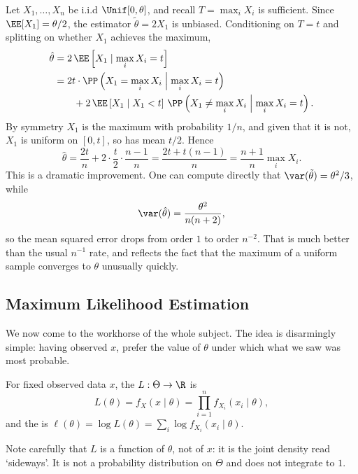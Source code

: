 \begin{example}
  Let $X_1, \dots, X_n$ be i.i.d $\Unif[0,\theta]$, and recall $T = \max_i X_i$ is sufficient. Since $\EE[X_1] = \theta/2$, the estimator $\tilde\theta = 2X_1$ is unbiased. Conditioning on $T = t$ and splitting on whether $X_1$ achieves the maximum,
  \begin{align*}
    \hat\theta &= 2\,\EE\left[X_1 \mid \max_i X_i = t\right]\\
    &= 2t \cdot \PP\left(X_1 = \max_i X_i \;\middle|\; \max_i X_i = t\right)\\
    &\qquad + 2\,\EE\left[X_1 \;\middle|\; X_1 < t\right]\,\PP\left(X_1 \neq \max_i X_i \;\middle|\; \max_i X_i = t\right).
  \end{align*}
  By symmetry $X_1$ is the maximum with probability $1/n$, and given that it is not, $X_1$ is uniform on $[0,t]$, so has mean $t/2$. Hence
  $$
  \hat\theta = \frac{2t}{n} + 2\cdot\frac{t}{2}\cdot\frac{n-1}{n} = \frac{2t + t(n-1)}{n} = \frac{n+1}{n}\max_i X_i.
  $$
  This is a dramatic improvement. One can compute directly that $\var(\tilde\theta) = \theta^2/3$, while
  $$
  \var(\hat\theta) = \frac{\theta^2}{n(n+2)},
  $$
  so the mean squared error drops from order $1$ to order $n^{-2}$. That is much better than the usual $n^{-1}$ rate, and reflects the fact that the maximum of a uniform sample converges to $\theta$ unusually quickly.
\end{example}

\subsection{Maximum Likelihood Estimation}

We now come to the workhorse of the whole subject. The idea is disarmingly simple: having observed $x$, prefer the value of $\theta$ under which what we saw was most probable.

\begin{definition}[Likelihood]
  For fixed observed data $x$, the  $L: \Theta \to \R$ is
  $$
  L(\theta) = f_X(x \mid \theta) = \prod_{i=1}^{n} f_{X_i}(x_i \mid \theta),
  $$
  and the  is $\ell(\theta) = \log L(\theta) = \sum_i \log f_{X_i}(x_i \mid \theta)$.
\end{definition}

Note carefully that $L$ is a function of $\theta$, not of $x$: it is the joint density read `sideways'. It is not a probability distribution on $\Theta$ and does not integrate to $1$.

